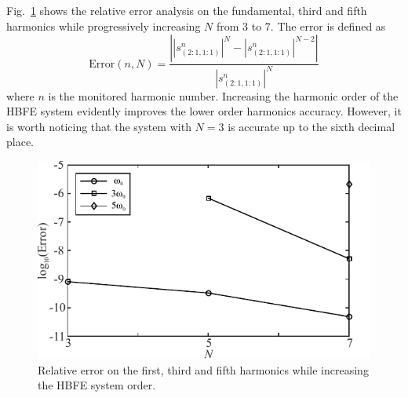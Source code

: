\documentclass[journal,twoside,letterpaper]{IEEEtran}
\begin{document}
Fig.~\ref{fig:harm_conv} shows the relative error analysis on the fundamental, third and fifth harmonics while progressively increasing $N$ from 3 to 7. The error is defined as
%
\begin{equation*}
\text{Error}(n,N) = \frac{\left| |{s^n_{(2:1,1:1)}}|^{N} - |{s^n_{(2:1,1:1)}}|^{N-2}\right|}{|{s^n_{(2:1,1:1)}}|^{N}}
\end{equation*}
%
\noindent where $n$ is the monitored harmonic number. Increasing the harmonic order of the HBFE system evidently improves the lower order harmonics accuracy. However, it is worth noticing that the system with $N=3$ is accurate up to the sixth decimal place. 
%
\begin{figure}[ht!]
\centering
\includegraphics[width=\columnwidth]{harm_conv}
\caption{Relative error on the first, third and fifth harmonics while increasing the HBFE system order.}
\label{fig:harm_conv}
\end{figure}
\end{document}

